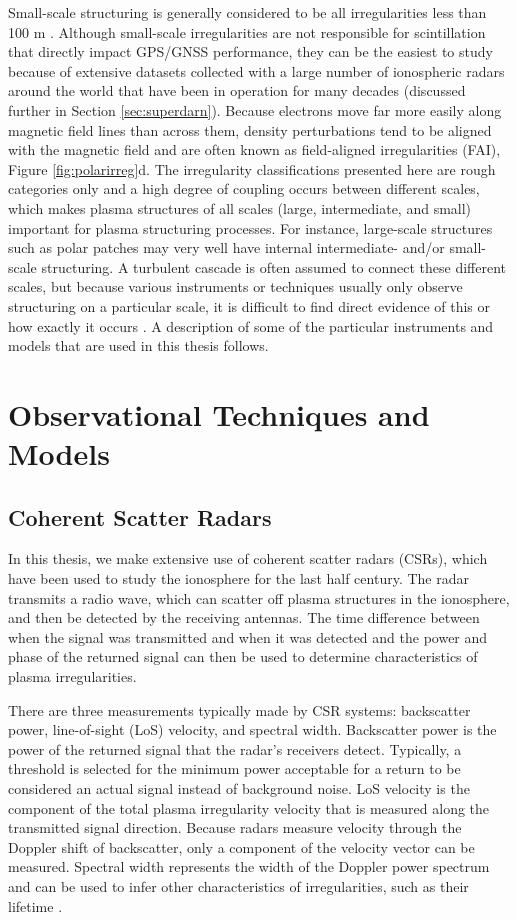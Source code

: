 Small-scale structuring is generally considered to be all irregularities less than 100 m \citep{Kelley2009}.  Although small-scale irregularities are not responsible for scintillation that directly impact GPS/GNSS performance, they can be the easiest to study because of extensive datasets collected with a large number of ionospheric radars around the world that have been in operation for many decades (discussed further in Section \ref{sec:superdarn}).  Because electrons move far more easily along magnetic field lines than across them, density perturbations tend to be aligned with the magnetic field and are often known as field-aligned irregularities (FAI), Figure \ref{fig:polarirreg}d.  The irregularity classifications presented here are rough categories only and a high degree of coupling occurs between different scales, which makes plasma structures of all scales (large, intermediate, and small) important for plasma structuring processes.  For instance, large-scale structures such as polar patches may very well have internal intermediate- and/or small-scale structuring.  A turbulent cascade is often assumed to connect these different scales, but because various instruments or techniques usually only observe structuring on a particular scale, it is difficult to find direct evidence of this or how exactly it occurs \citep{Kintner1985,Tsunoda1985}.  A description of some of the particular instruments and models that are used in this thesis follows.

\section{Observational Techniques and Models}

\subsection{Coherent Scatter Radars}
\label{sec:csr}
In this thesis, we make extensive use of coherent scatter radars (CSRs), which have been used to study the ionosphere for the last half century.  The radar transmits a radio wave, which can scatter off plasma structures in the ionosphere, and then be detected by the receiving antennas.  The time difference between when the signal was transmitted and when it was detected and the power and phase of the returned signal can then be used to determine characteristics of plasma irregularities.

There are three measurements typically made by CSR systems: backscatter power, line-of-sight (LoS) velocity, and spectral width.  Backscatter power is the power of the returned signal that the radar's receivers detect.  Typically, a threshold is selected for the minimum power acceptable for a return to be considered an actual signal instead of background noise.  LoS velocity is the component of the total plasma irregularity velocity that is measured along the transmitted signal direction.  Because radars measure velocity through the Doppler shift of backscatter, only a component of the velocity vector can be measured.  Spectral width represents the width of the Doppler power spectrum and can be used to infer other characteristics of irregularities, such as their lifetime \citep{Greenwald1985}.

